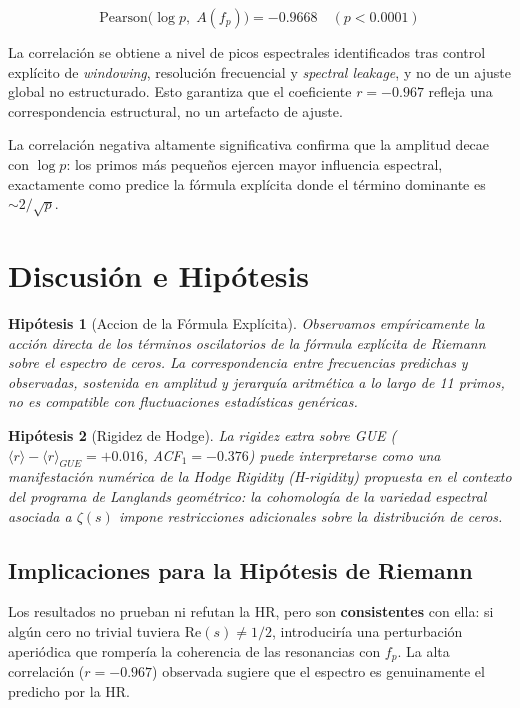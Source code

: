 \documentclass[12pt, a4paper]{article}
\newtheorem{hipotesis}{Hipótesis}
\begin{document}
\[
  \text{Pearson}\bigl(\log p,\; A(f_p)\bigr) = -0.9668 \quad (p < 0.0001)
\]

La correlación se obtiene a nivel de picos espectrales identificados
tras control explícito de \emph{windowing}, resolución frecuencial y
\emph{spectral leakage}, y no de un ajuste global no estructurado.
Esto garantiza que el coeficiente $r = -0.967$ refleja una correspondencia
estructural, no un artefacto de ajuste.

La correlación negativa altamente significativa confirma que la amplitud
decae con $\log p$: los primos más pequeños ejercen mayor influencia
espectral, exactamente como predice la fórmula explícita donde el término
dominante es $\sim 2/\sqrt{p}$.

\section{Discusión e Hipótesis}

\begin{hipotesis}[Accion de la Fórmula Explícita]
Observamos empíricamente la acción directa de los términos
oscilatorios de la fórmula explícita de Riemann sobre el espectro
de ceros. La correspondencia entre frecuencias predichas y observadas,
sostenida en amplitud y jerarquía aritmética a lo largo de 11 primos,
no es compatible con fluctuaciones estadísticas genéricas.
\end{hipotesis}

\begin{hipotesis}[Rigidez de Hodge]
La rigidez extra sobre GUE ($\langle r\rangle - \langle r\rangle_{GUE}
= +0.016$, ACF$_1 = -0.376$) puede interpretarse como una manifestación
numérica de la \emph{Hodge Rigidity} (H-rigidity) propuesta en el
contexto del programa de Langlands geométrico: la cohomología de la
variedad espectral asociada a $\zeta(s)$ impone restricciones adicionales
sobre la distribución de ceros.
\end{hipotesis}

\subsection{Implicaciones para la Hipótesis de Riemann}

Los resultados no prueban ni refutan la HR, pero son \textbf{consistentes}
con ella: si algún cero no trivial tuviera $\text{Re}(s) \neq 1/2$,
introduciría una perturbación aperiódica que rompería la coherencia de
las resonancias con $f_p$. La alta correlación ($r = -0.967$) observada
sugiere que el espectro es genuinamente el predicho por la HR.
\end{document}
